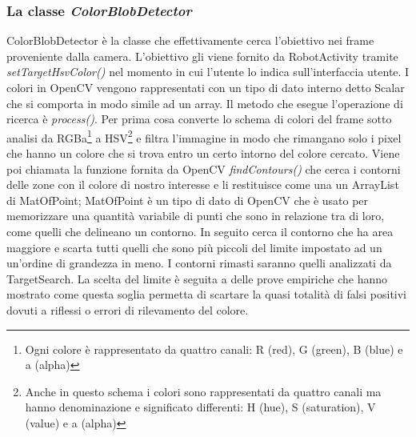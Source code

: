 \subsubsection{La classe \emph{ColorBlobDetector}}
ColorBlobDetector è la classe che effettivamente cerca l'obiettivo nei
frame proveniente dalla camera. L'obiettivo gli viene fornito da RobotActivity 
tramite \emph{setTargetHsvColor()} nel momento in cui l'utente lo indica 
sull'interfaccia utente. I colori in OpenCV vengono rappresentati con un tipo di dato interno
detto Scalar che si comporta in modo simile ad un array. Il metodo che esegue 
l'operazione di ricerca è \emph{process()}. Per prima cosa converte lo schema di 
colori del frame sotto analisi da RGBa\footnote{Ogni colore è rappresentato da 
quattro canali: R (red), G (green), B (blue) e a (alpha) } a HSV\footnote{Anche in questo
schema i colori sono rappresentati da quattro canali ma hanno denominazione e 
significato differenti: H (hue), S (saturation), V (value) e  a (alpha)} e filtra l'immagine in modo che rimangano solo 
i pixel che hanno un colore che si trova entro un certo intorno del colore cercato.
Viene poi chiamata la funzione fornita da OpenCV \emph{findContours()} che cerca i contorni delle
zone con il colore di nostro interesse e li restituisce come una un ArrayList di MatOfPoint;
MatOfPoint è un tipo di dato di OpenCV che è usato per memorizzare una quantità variabile
di punti che sono in relazione tra di loro, come quelli che delineano un contorno.
In seguito cerca il contorno che ha area maggiore e scarta tutti quelli che sono più piccoli 
del limite impostato ad un un'ordine di grandezza in meno. I contorni rimasti 
saranno quelli analizzati da TargetSearch. La scelta del limite è 
seguita a delle prove empiriche che hanno mostrato come questa soglia permetta di
scartare la quasi totalità di falsi positivi dovuti a riflessi o errori di 
rilevamento del colore. 

